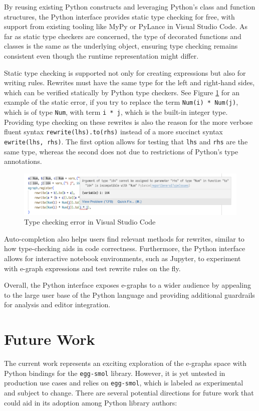 \documentclass[sigplan,screen,review]{acmart}
\begin{document}
By reusing existing Python constructs and leveraging Python's class and function structures, the Python interface provides static type checking for free, with support from existing tooling like MyPy or PyLance in Visual Studio Code. As far as static type checkers are concerned, the type of decorated functions and classes is the same as the underlying object, ensuring type checking remains consistent even though the runtime representation might differ.

Static type checking is supported not only for creating expressions but also for writing rules. Rewrites must have the same type for the left and right-hand sides, which can be verified statically by Python type checkers. See Figure \ref{fig:screenshot} for an example of the static error, if you try to replace the term \verb|Num(i) * Num(j)|, which is of type \verb|Num|, with term \verb|i * j|, which is the built-in integer type. Providing type checking on these rewrites is also the reason for the more verbose fluent syntax \verb|rewrite(lhs).to(rhs)| instead of a more succinct syntax \verb|ewrite(lhs, rhs)|. The first option allows for testing that \verb|lhs| and \verb|rhs| are the same type, whereas the second does not due to restrictions of Python's type annotations.

\begin{figure}
   \centering
   \includegraphics[width=1\textwidth]{screenshot.png}
   \caption{Type checking error in Visual Studio Code}
   \label{fig:screenshot}
\end{figure}

Auto-completion also helps users find relevant methods for rewrites, similar to how type-checking aids in code correctness. Furthermore, the Python interface allows for interactive notebook environments, such as Jupyter, to experiment with e-graph expressions and test rewrite rules on the fly.

Overall, the Python interface exposes e-graphs to a wider audience by appealing to the large user base of the Python language and providing additional guardrails for analysis and editor integration.

\section{Future Work}
The current work represents an exciting exploration of the e-graphs space with Python bindings for the \verb|egg-smol| library. However, it is yet untested in production use cases and relies on \verb|egg-smol|, which is labeled as experimental and subject to change. There are several potential directions for future work that could aid in its adoption among Python library authors:
\end{document}
